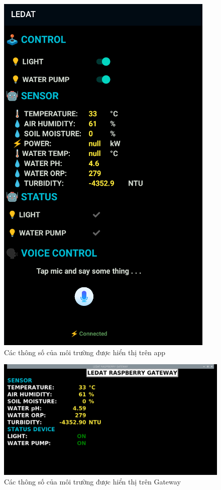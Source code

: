 \begin{figure}[H]
	\centering
	\includegraphics[scale=0.4]{Chapter 4/image chapter 4/appMT.png}
	\caption[Các thông số của môi trường được hiển thị trên app]{Các thông số của môi trường được hiển thị trên app}
	\label{hinh43}
\end{figure}
\begin{figure}[H]
	\centering
	\includegraphics[scale=0.4]{Chapter 4/image chapter 4/gwMT.png}
	\caption[Các thông số của môi trường được hiển thị trên Gateway]{Các thông số của môi trường được hiển thị trên Gateway}
	\label{hinh44}
\end{figure}
